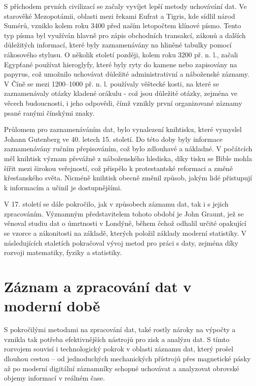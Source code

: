 S příchodem prvních civilizací se začaly vyvíjet lepší metody uchovávání dat. Ve starověké Mezopotámii, oblasti mezi řekami Eufrat a Tigris, kde sídlil národ 
Sumérů, vzniklo kolem roku 3400 před naším letopočtem klínové písmo. Tento typ písma byl využíván hlavně pro zápis obchodních transakcí, zákonů a dalších 
důležitých informací, které byly zaznamenávány na hliněné tabulky pomocí rákosového stylusu. O několik století později, kolem roku 3200 př. n. l., začali 
Egypťané používat hieroglyfy, které byly ryty do kamene nebo zapisovány na papyrus, což umožnilo uchovávat důležité administrativní a náboženské záznamy. 
V Číně se mezi 1200–1000 př. n. l. používaly věštecké kosti, na které se zaznamenávaly otázky kladené orákulu - což jsou důležité otázky, zejména ve věcech 
budoucnosti, i jeho odpovědi, čímž vznikly první organizované záznamy psané ranými čínskými znaky.

\newpage

Průlomem pro zaznamenáváním dat, bylo vynalezení knihtisku, které vymyslel Johann Gutenberg ve 40. letech 15. století. Do této doby byly informace 
zaznamenávány ručním přepisováním, což bylo zdlouhavé a nákladné. V počátcích měl knihtisk význam převážně z náboženského hlediska, díky tisku se Bible 
mohla šířit mezi širokou veřejností, což přispělo k protestantské reformaci a změně křesťanského světa. Nicméně knihtisk obecně změnil způsob, jakým lidé 
přistupují k informacím a učinil je dostupnějšími. \cite{knihtisk_medium}

V 17. století se dále pokročilo, jak v způsobech záznamu dat, tak i s jejich zpracováním. Významným představitelem tohoto období je John Graunt, jež se 
věnoval studiu dat o úmrtnosti v Londýně, během čehož odhalil určité opakující se vzorce a zákonitosti na základě, kterých položil základy moderní statistiky. 
V následujících staletích pokračoval vývoj metod pro práci s daty, zejména díky rozvoji matematiky, fyziky a statistiky. \cite{britanicca_John_Graunt}
\section{Záznam a zpracování dat v moderní době}
S pokročilými metodami na zpracování dat, také rostly nároky na výpočty a vznikla tak potřeba efektivnějších nástrojů pro zisk a analýzu dat. S tímto rozvojem 
souvisí i technologický pokrok v oblasti záznamu dat, který prošel dlouhou cestou – od jednoduchých mechanických přístrojů přes magnetické pásky až po moderní 
digitální záznamníky schopné uchovávat a analyzovat obrovské objemy informací v reálném čase.


